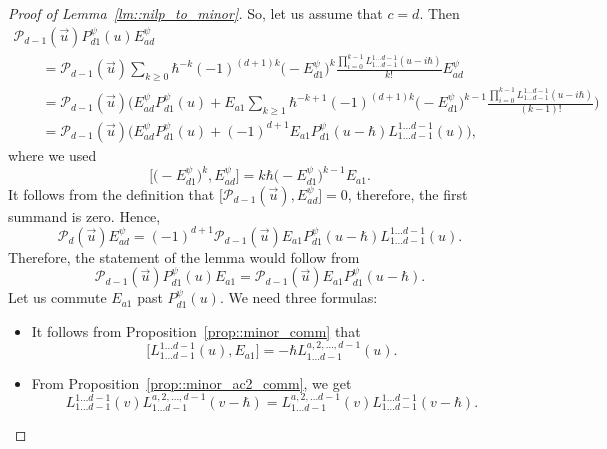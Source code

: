 \documentclass[10pt,a4paper]{article}
\numberwithin{equation}{section}
\newcommand{\calP}{\mathcal{P}}
\begin{document}
\begin{proof}[Proof of Lemma~\ref{lm::nilp_to_minor}]
		So, let us assume that $c=d$. Then
		\begin{gather*}
			\calP_{d-1}(\vec{u}) P^{\psi}_{d1}(u) E_{ad}^{\psi} \\
		\qquad	= \calP_{d-1}(\vec{u})\sum\limits_{k\geq 0} \hbar^{-k} (-1)^{(d+1)k} \bigl(-E_{d1}^{\psi}\bigr)^k \frac{\prod\limits_{i=0}^{k-1} L_{1\dots d-1}^{1\dots d-1}(u-i\hbar )}{k!} E_{ad}^{\psi} \\
			\qquad= \calP_{d-1}(\vec{u}) \Biggl( E_{ad}^{\psi} P^{\psi}_{d1}(u) + E_{a1} \sum\limits_{k\geq 1} \hbar^{-k+1} (-1)^{(d+1)k} \bigl(-E_{d1}^{\psi}\bigr)^{k-1} \frac{\prod\limits_{i=0}^{k-1} L_{1\dots d-1}^{1\dots d-1}(u-i\hbar)}{(k-1)!} \Biggr) \\
		\qquad	=  \calP_{d-1}(\vec{u}) \bigl( E_{ad}^{\psi} P^{\psi}_{d1}(u) + (-1)^{d+1} E_{a1} P^{\psi}_{d1}(u-\hbar) L_{1\dots d-1}^{1\dots d-1}(u) \bigr),
		\end{gather*}
		where we used
		\[
		\bigl[\bigl(-E_{d1}^{\psi}\bigr)^k, E_{ad}^{\psi}\bigr] = k \hbar \bigl(-E_{d1}^{\psi}\bigr)^{k-1} E_{a1}.
		\]
		It follows from the definition that $\bigl[\calP_{d-1}(\vec{u}),E_{ad}^{\psi}\bigr]=0$, therefore, the first summand is zero. Hence,
		\[
		\calP_{d}(\vec{u}) E_{ad}^{\psi} = (-1)^{d+1} \calP_{d-1}(\vec{u})E_{a1} P^{\psi}_{d1}(u-\hbar) L_{1\dots d-1}^{1\dots d-1}(u).
		\]
		Therefore, the statement of the lemma would follow from
		\begin{equation}
			\label{eq::lm_nilp_to_minor_shift}
			\calP_{d-1}(\vec{u}) P_{d1}^{\psi}(u) E_{a1} = \calP_{d-1}(\vec{u}) E_{a1} P_{d1}^{\psi}(u-\hbar).
		\end{equation}
		Let us commute $E_{a1}$ past $P_{d1}^{\psi}(u)$. We need three formulas:
		\begin{itemize}\itemsep=0pt
			\item It follows from Proposition~\ref{prop::minor_comm} that
			\begin{equation*}
				\bigl[L_{1\dots d-1}^{1\dots d-1}(u), E_{a1}\bigr] = - \hbar L_{1 \dots d-1}^{a,2,\dots,d-1}(u).
			\end{equation*}
			
			\item From Proposition~\ref{prop::minor_ac2_comm}, we get
			\[
			L_{1\dots d-1}^{1\dots d-1}(v) L_{1\dots d-1}^{a,2,\dots,d-1}(v-\hbar) = L_{1 \dots d-1}^{a,2,\dots d-1}(v) L_{1\dots d-1}^{1\dots d-1}(v-\hbar).
			\]
			

\end{itemize}
\end{proof}
\end{document}
